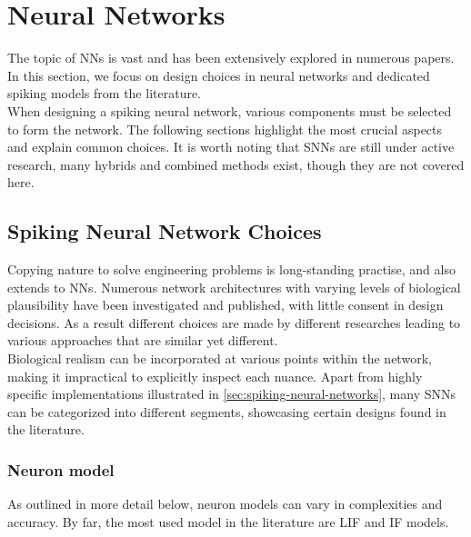 \section{Neural Networks}
The topic of \acp{NN} is vast and has been extensively explored in numerous papers. In this section, we focus on design choices in neural networks and dedicated spiking models from the literature.\\
When designing a spiking neural network, various components must be selected to form the network. The following sections highlight the most crucial aspects and explain common choices. It is worth noting that \acp{SNN} are still under active research, many hybrids and combined methods exist, though they are not covered here.\\
\subsection{Spiking Neural Network Choices}

Copying nature to solve engineering problems is long-standing practise, and also extends to \acp{NN}. Numerous network architectures with varying levels of biological plausibility have been investigated and published, with little consent in design decisions. As a result different choices are made by different researches leading to various approaches that are similar yet different.\\
Biological realism can be incorporated at various points within the network, making it impractical to explicitly inspect each nuance. Apart from highly specific implementations illustrated in \cref{sec:spiking-neural-networks}, many \acp{SNN} can be categorized into different segments, showcasing certain designs found in the literature.
\subsubsection{Neuron model}
As outlined in more detail below, neuron models can vary in complexities and accuracy. By far, the most used model in the literature are \ac{LIF} and \ac{IF} models.
